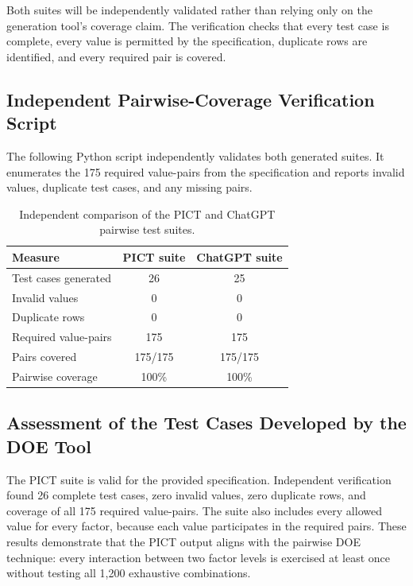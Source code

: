 \documentclass[11pt]{article}
\begin{document}
Both suites will be independently validated rather than relying only on the generation tool's coverage claim. The verification checks that every test case is complete, every value is permitted by the specification, duplicate rows are identified, and every required pair is covered.

\subsection{Independent Pairwise-Coverage Verification Script}

The following Python script independently validates both generated suites. It enumerates the 175 required value-pairs from the specification and reports invalid values, duplicate test cases, and any missing pairs.



\begin{table}[H]
\centering
\caption{Independent comparison of the PICT and ChatGPT pairwise test suites.}
\begin{tabular}{p{2.5in}cc}
\toprule
\textbf{Measure} & \textbf{PICT suite} & \textbf{ChatGPT suite} \\
\midrule
Test cases generated & 26 & 25 \\
Invalid values & 0 & 0 \\
Duplicate rows & 0 & 0 \\
Required value-pairs & 175 & 175 \\
Pairs covered & 175/175 & 175/175 \\
Pairwise coverage & 100\% & 100\% \\
\bottomrule
\end{tabular}
\end{table}

\subsection{Assessment of the Test Cases Developed by the DOE Tool}

The PICT suite is valid for the provided specification. Independent verification found 26 complete test cases, zero invalid values, zero duplicate rows, and coverage of all 175 required value-pairs. The suite also includes every allowed value for every factor, because each value participates in the required pairs. These results demonstrate that the PICT output aligns with the pairwise DOE technique: every interaction between two factor levels is exercised at least once without testing all 1,200 exhaustive combinations.
\end{document}
